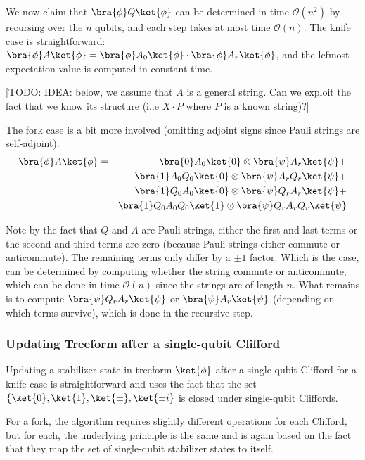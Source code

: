 We now claim that $\bra{\phi} Q \ket{\phi}$ can be determined in time $\mathcal{O}(n^2)$ by recursing over the $n$ qubits, and each step takes at most time $\mathcal{O}(n)$.
The knife case is straightforward: $\bra{\phi} A \ket{\phi} = \bra{\phi} A_0 \ket{\phi} \cdot \bra{\phi} A_r \ket{\phi}$, and the lefmost expectation value is computed in constant time.

[TODO: IDEA: below, we assume that $A$ is a general string. Can we exploit the fact that we know its structure (i..e $X \cdot P$ where $P$ is a known string)?]

The fork case is a bit more involved (omitting adjoint signs since Pauli strings are self-adjoint):
\begin{eqnarray}
\bra{\phi} A \ket{\phi}
    &=&
\bra{0} A_0 \ket{0} \otimes \bra{\psi} A_r \ket{\psi}
+
\\
    &&
\bra{1} A_0 Q_0 \ket{0} \otimes \bra{\psi} A_r Q_r \ket{\psi}
+
\\
    &&
\bra{1} Q_0 A_0 \ket{0} \otimes \bra{\psi} Q_r A_r \ket{\psi}
+
\\
    &&
\bra{1} Q_0 A_0 Q_0 \ket{1} \otimes \bra{\psi} Q_r A_r Q_r \ket{\psi}
\end{eqnarray}

Note by the fact that $Q$ and $A$ are Pauli strings, either the first and last terms or the second and third terms are zero (because Pauli strings either commute or anticommute).
The remaining terms only differ by a $\pm 1$ factor.
Which is the case, can be determined by computing whether the string commute or anticommute, which can be done in time $\mathcal{O}(n)$ since the strings are of length $n$.
What remains is to compute $\bra{\psi} Q_r A_r \ket{\psi}$ or $\bra{\psi} A_r \ket{\psi}$ (depending on which terms survive), which is done in the recursive step.






\subsubsection{Updating Treeform after a single-qubit Clifford}

Updating a stabilizer state in treeform $\ket{\phi}$ after a single-qubit Clifford for a knife-case is straightforward and uses the fact that the set $\{\ket{0}, \ket{1}, \ket{\pm}, \ket{\pm i}$ is closed under single-qubit Cliffords.


For a fork, the algorithm requires slightly different operations for each Clifford, but for each, the underlying principle is the same and is again based on the fact that they map the set of single-qubit stabilizer states to itself.

